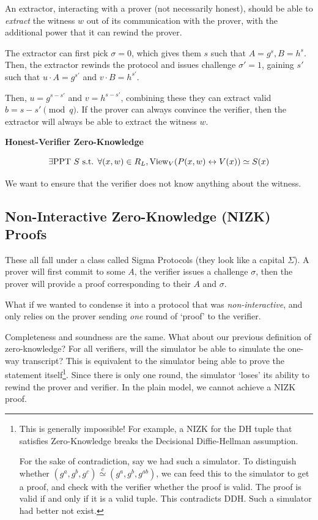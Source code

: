 An extractor, interacting with a prover (not necessarily honest), should be able to \emph{extract} the witness $w$ out of its communication with the prover, with the additional power that it can rewind the prover.


The extractor can first pick $\sigma = 0$, which gives them $s$ such that $A = g^s, B = h^s$. Then, the extractor rewinds the protocol and issues challenge $\sigma' = 1$, gaining $s'$ such that $u\cdot A = g^{s'}$ and $v\cdot B = h^{s'}$.

Then, $u = g^{s-s'}$ and $v = h^{s-s'}$, combining these they can extract valid $b = s-s'\pmod{q}$. If the prover can always convince the verifier, then the extractor will always be able to extract the witness $w$.

\textbf{Honest-Verifier Zero-Knowledge}

\[\exists\mathrm{PPT}\ S\text{ s.t. }\forall(x, w)\in R_L, \mathrm{View}_V(P(x, w)\leftrightarrow V(x))\simeq S(x)\]

We want to ensure that the verifier does not know anything about the witness. 

\subsection{Non-Interactive Zero-Knowledge (NIZK) Proofs}

These all fall under a class called Sigma Protocols (they look like a capital $\Sigma$). A prover will first commit to some $A$, the verifier issues a challenge $\sigma$, then the prover will provide a proof corresponding to their $A$ and $\sigma$.

What if we wanted to condense it into a protocol that was \emph{non-interactive}, and only relies on the prover sending \emph{one} round of `proof' to the verifier.


Completeness and soundness are the same. What about our previous definition of zero-knowledge? For all verifiers, will the simulator be able to simulate the one-way transcript? This is equivalent to the simulator being able to prove the statement itself\footnote{This is generally impossible! For example, a NIZK for the DH tuple that satisfies Zero-Knowledge breaks the Decisional Diffie-Hellman assumption.

    For the sake of contradiction, say we had such a simulator. To distinguish whether $(g^a, g^b, g^c)\overset{c}{\simeq}(g^a, g^b, g^{ab})$, we can feed this to the simulator to get a proof, and check with the verifier whether the proof is valid. The proof is valid if and only if it is a valid tuple. This contradicts DDH. Such a simulator had better not exist. }. Since there is only one round, the simulator `loses' its ability to rewind the prover and verifier. In the plain model, we cannot achieve a NIZK proof.


